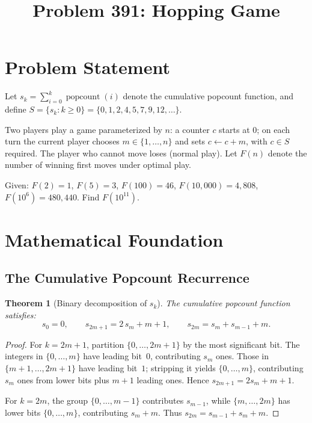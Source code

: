 \documentclass[11pt,a4paper]{article}
\title{Problem 391: Hopping Game}
\author{}
\date{}
\newtheorem{theorem}{Theorem}
\begin{document}
\maketitle

\section{Problem Statement}

Let $s_k = \sum_{i=0}^{k} \operatorname{popcount}(i)$ denote the cumulative popcount function, and define $S = \{s_k : k \ge 0\} = \{0, 1, 2, 4, 5, 7, 9, 12, \ldots\}$.

Two players play a game parameterized by $n$: a counter $c$ starts at $0$; on each turn the current player chooses $m \in \{1, \ldots, n\}$ and sets $c \leftarrow c + m$, with $c \in S$ required. The player who cannot move loses (normal play). Let $F(n)$ denote the number of winning first moves under optimal play.

Given: $F(2) = 1$, $F(5) = 3$, $F(100) = 46$, $F(10{,}000) = 4{,}808$, $F(10^6) = 480{,}440$. Find $F(10^{11})$.

\section{Mathematical Foundation}

\subsection{The Cumulative Popcount Recurrence}

\begin{theorem}[Binary decomposition of $s_k$]
\label{thm:recurrence}
The cumulative popcount function satisfies:
\[
s_0 = 0, \qquad s_{2m+1} = 2\,s_m + m + 1, \qquad s_{2m} = s_m + s_{m-1} + m.
\]
\end{theorem}

\begin{proof}
For $k = 2m+1$, partition $\{0, \ldots, 2m+1\}$ by the most significant bit. The integers in $\{0, \ldots, m\}$ have leading bit~$0$, contributing $s_m$ ones. Those in $\{m+1, \ldots, 2m+1\}$ have leading bit~$1$; stripping it yields $\{0, \ldots, m\}$, contributing $s_m$ ones from lower bits plus $m+1$ leading ones. Hence $s_{2m+1} = 2s_m + m + 1$.

For $k = 2m$, the group $\{0, \ldots, m-1\}$ contributes $s_{m-1}$, while $\{m, \ldots, 2m\}$ has lower bits $\{0, \ldots, m\}$, contributing $s_m + m$. Thus $s_{2m} = s_{m-1} + s_m + m$.
\end{proof}
\end{document}
